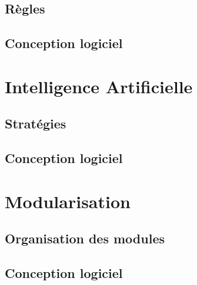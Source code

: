 \documentclass[a4paper,12pt]{article}
\begin{document}
\subsection{Règles}

\clearpage
\subsection{Conception logiciel}




\section{Intelligence Artificielle}

\subsection{Stratégies}

\clearpage
\subsection{Conception logiciel}




\section{Modularisation}
\label{sec:module}

\subsection{Organisation des modules}

\clearpage
\subsection{Conception logiciel}
\end{document}
